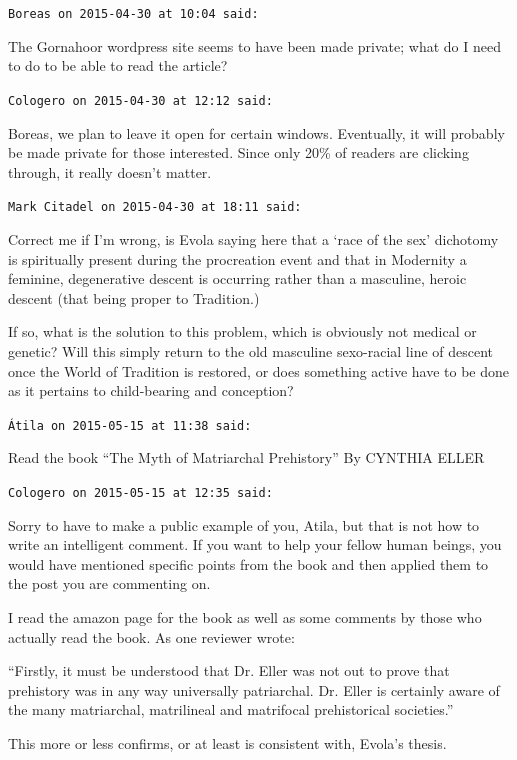 \begin{footnotesize}
\begin{sffamily}
\texttt{Boreas on 2015-04-30 at 10:04 said:}

The Gornahoor wordpress site seems to have been made private; what do I need to do to be able to read the article?

\hfill

\texttt{Cologero on 2015-04-30 at 12:12 said:}

Boreas, we plan to leave it open for certain windows. Eventually, it will probably be made private for those interested. Since only 20\% of readers are clicking through, it really doesn't matter.

\hfill

\texttt{Mark Citadel on 2015-04-30 at 18:11 said:}

Correct me if I'm wrong, is Evola saying here that a `race of the sex' dichotomy is spiritually present during the procreation event and that in Modernity a feminine, degenerative descent is occurring rather than a masculine, heroic descent (that being proper to Tradition.)

If so, what is the solution to this problem, which is obviously not medical or genetic? Will this simply return to the old masculine sexo-racial line of descent once the World of Tradition is restored, or does something active have to be done as it pertains to child-bearing and conception?

\hfill

\texttt{Átila on 2015-05-15 at 11:38 said:}

Read the book ``The Myth of Matriarchal Prehistory'' By CYNTHIA ELLER

\hfill

\texttt{Cologero on 2015-05-15 at 12:35 said:}

Sorry to have to make a public example of you, Atila, but that is not how to write an intelligent comment. If you want to help your fellow human beings, you would have mentioned specific points from the book and then applied them to the post you are commenting on.

I read the amazon page for the book as well as some comments by those who actually read the book. As one reviewer wrote:

``Firstly, it must be understood that Dr. Eller was not out to prove that prehistory was in any way universally patriarchal. Dr. Eller is certainly aware of the many matriarchal, matrilineal and matrifocal prehistorical societies.''

This more or less confirms, or at least is consistent with, Evola's thesis.

\end{sffamily}
\end{footnotesize}


